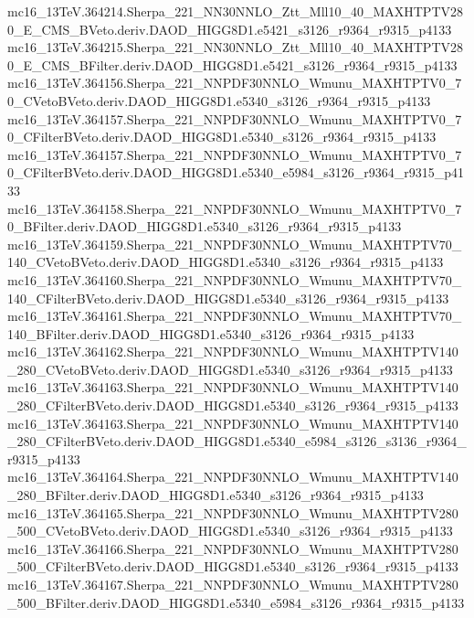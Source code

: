 mc16_13TeV.364214.Sherpa_221_NN30NNLO_Ztt_Mll10_40_MAXHTPTV280_E_CMS_BVeto.deriv.DAOD_HIGG8D1.e5421_s3126_r9364_r9315_p4133 \\
mc16_13TeV.364215.Sherpa_221_NN30NNLO_Ztt_Mll10_40_MAXHTPTV280_E_CMS_BFilter.deriv.DAOD_HIGG8D1.e5421_s3126_r9364_r9315_p4133 \\
mc16_13TeV.364156.Sherpa_221_NNPDF30NNLO_Wmunu_MAXHTPTV0_70_CVetoBVeto.deriv.DAOD_HIGG8D1.e5340_s3126_r9364_r9315_p4133 \\
mc16_13TeV.364157.Sherpa_221_NNPDF30NNLO_Wmunu_MAXHTPTV0_70_CFilterBVeto.deriv.DAOD_HIGG8D1.e5340_s3126_r9364_r9315_p4133 \\
mc16_13TeV.364157.Sherpa_221_NNPDF30NNLO_Wmunu_MAXHTPTV0_70_CFilterBVeto.deriv.DAOD_HIGG8D1.e5340_e5984_s3126_r9364_r9315_p4133 \\
mc16_13TeV.364158.Sherpa_221_NNPDF30NNLO_Wmunu_MAXHTPTV0_70_BFilter.deriv.DAOD_HIGG8D1.e5340_s3126_r9364_r9315_p4133 \\
mc16_13TeV.364159.Sherpa_221_NNPDF30NNLO_Wmunu_MAXHTPTV70_140_CVetoBVeto.deriv.DAOD_HIGG8D1.e5340_s3126_r9364_r9315_p4133 \\
mc16_13TeV.364160.Sherpa_221_NNPDF30NNLO_Wmunu_MAXHTPTV70_140_CFilterBVeto.deriv.DAOD_HIGG8D1.e5340_s3126_r9364_r9315_p4133 \\
mc16_13TeV.364161.Sherpa_221_NNPDF30NNLO_Wmunu_MAXHTPTV70_140_BFilter.deriv.DAOD_HIGG8D1.e5340_s3126_r9364_r9315_p4133 \\
mc16_13TeV.364162.Sherpa_221_NNPDF30NNLO_Wmunu_MAXHTPTV140_280_CVetoBVeto.deriv.DAOD_HIGG8D1.e5340_s3126_r9364_r9315_p4133 \\
mc16_13TeV.364163.Sherpa_221_NNPDF30NNLO_Wmunu_MAXHTPTV140_280_CFilterBVeto.deriv.DAOD_HIGG8D1.e5340_s3126_r9364_r9315_p4133 \\
mc16_13TeV.364163.Sherpa_221_NNPDF30NNLO_Wmunu_MAXHTPTV140_280_CFilterBVeto.deriv.DAOD_HIGG8D1.e5340_e5984_s3126_s3136_r9364_r9315_p4133 \\
mc16_13TeV.364164.Sherpa_221_NNPDF30NNLO_Wmunu_MAXHTPTV140_280_BFilter.deriv.DAOD_HIGG8D1.e5340_s3126_r9364_r9315_p4133 \\
mc16_13TeV.364165.Sherpa_221_NNPDF30NNLO_Wmunu_MAXHTPTV280_500_CVetoBVeto.deriv.DAOD_HIGG8D1.e5340_s3126_r9364_r9315_p4133 \\
mc16_13TeV.364166.Sherpa_221_NNPDF30NNLO_Wmunu_MAXHTPTV280_500_CFilterBVeto.deriv.DAOD_HIGG8D1.e5340_s3126_r9364_r9315_p4133 \\
mc16_13TeV.364167.Sherpa_221_NNPDF30NNLO_Wmunu_MAXHTPTV280_500_BFilter.deriv.DAOD_HIGG8D1.e5340_e5984_s3126_r9364_r9315_p4133 \\
